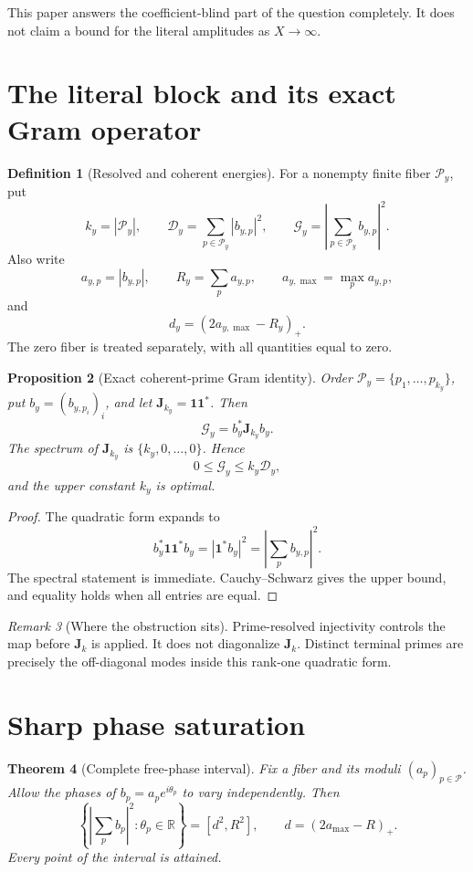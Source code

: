 \documentclass[11pt,a4paper]{article}
\newtheorem{theorem}{Theorem}[section]
\newtheorem{proposition}[theorem]{Proposition}
\theoremstyle{definition}
\newtheorem{definition}[theorem]{Definition}
\theoremstyle{remark}
\newtheorem{remark}[theorem]{Remark}
\newcommand{\one}{\mathbf 1}
\newcommand{\cP}{\mathcal P}
\newcommand{\cD}{\mathcal D}
\newcommand{\cG}{\mathcal G}
\begin{document}
This paper answers the coefficient-blind part of the question
completely.  It does not claim a bound for the literal amplitudes as
\(X\to\infty\).

\section{The literal block and its exact Gram operator}

\begin{definition}[Resolved and coherent energies]
For a nonempty finite fiber \(\cP_y\), put
\[
 k_y=|\cP_y|,\qquad
 \cD_y=\sum_{p\in\cP_y}|b_{y,p}|^2,\qquad
 \cG_y=\left|\sum_{p\in\cP_y}b_{y,p}\right|^2.
\]
Also write
\[
 a_{y,p}=|b_{y,p}|,\qquad
 R_y=\sum_pa_{y,p},\qquad
 a_{y,\max}=\max_pa_{y,p},
\]
and
\[
 d_y=(2a_{y,\max}-R_y)_+.
\]
The zero fiber is treated separately, with all quantities equal to
zero.
\end{definition}

\begin{proposition}[Exact coherent-prime Gram identity]
\label{prop:gram}
Order \(\cP_y=\{p_1,\dots,p_{k_y}\}\), put
\(b_y=(b_{y,p_i})_i\), and let
\(\mathbf J_{k_y}=\one\one^*\).  Then
\[
 \boxed{\cG_y=b_y^*\mathbf J_{k_y}b_y.}
\]
The spectrum of \(\mathbf J_{k_y}\) is
\(\{k_y,0,\dots,0\}\).  Hence
\[
 0\le\cG_y\le k_y\cD_y,
\]
and the upper constant \(k_y\) is optimal.
\end{proposition}

\begin{proof}
The quadratic form expands to
\[
 b_y^*\one\one^*b_y
 =|\one^*b_y|^2
 =\left|\sum_pb_{y,p}\right|^2.
\]
The spectral statement is immediate.  Cauchy--Schwarz gives the
upper bound, and equality holds when all entries are equal.
\end{proof}

\begin{remark}[Where the obstruction sits]
Prime-resolved injectivity controls the map before \(\mathbf J_k\)
is applied.  It does not diagonalize \(\mathbf J_k\).  Distinct
terminal primes are precisely the off-diagonal modes inside this
rank-one quadratic form.
\end{remark}

\section{Sharp phase saturation}

\begin{theorem}[Complete free-phase interval]
\label{thm:interval}
Fix a fiber and its moduli \((a_p)_{p\in\cP}\).  Allow the phases of
\(b_p=a_pe^{i\theta_p}\) to vary independently.  Then
\[
 \boxed{
 \left\{\left|\sum_pb_p\right|^2:
        \theta_p\in\mathbb R\right\}
 =
 [d^2,R^2],}
 \qquad
 d=(2a_{\max}-R)_+.
\]
Every point of the interval is attained.
\end{theorem}
\end{document}

